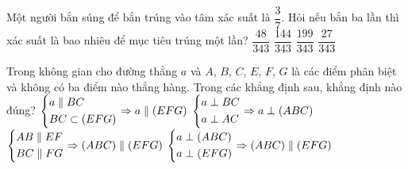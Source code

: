 \begin{ex}%
Một người bắn súng để bắn trúng vào tâm xác suất là $\dfrac{3}{7}$. Hỏi nếu bắn ba lần thì xác suất là bao nhiêu để mục tiêu trúng một lần?
\choice
{$\dfrac{48}{343}$}
{\True $\dfrac{144}{343}$}
{$\dfrac{199}{343}$}
{$\dfrac{27}{343}$}
\end{ex}

\begin{ex}%
Trong không gian cho đường thẳng $a$ và $A$, $B$, $C$, $E$, $F$, $G$ là các điểm phân biệt và không có ba điểm nào thẳng hàng. Trong các khẳng định sau, khẳng định nào đúng?
\choice
{$\left\{\begin{aligned}& a\parallel BC\\& BC\subset (EFG)\end{aligned}\right.\Rightarrow a\parallel (EFG)$}
{\True $\left\{\begin{aligned}& a\perp BC\\& a\perp AC\end{aligned}\right.\Rightarrow a\perp (ABC)$}
{$\left\{\begin{aligned}&AB\parallel EF\\& BC\parallel FG\end{aligned}\right.\Rightarrow (ABC)\parallel (EFG)$}
{$\left\{\begin{aligned}& a\perp (ABC)\\& a\perp (EFG)\end{aligned}\right.\Rightarrow (ABC)\parallel (EFG)$} 
\end{ex}

